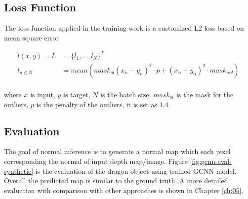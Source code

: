 \subsection{Loss Function}
The loss function applied in the training work is a customized L2 loss based on mean square error

\begin{equation}\label{gcnn-loss}
	\begin{array}{ll}
		l(x,y)= L  &= \{l_1, ..., l_N\}^T\\ 
		l_{n\in N} &= mean(mask_{ol}(x_n - y_n)^2\cdot p + (x_n - y_n)^2\cdot mask_{nol})\\
	\end{array}
\end{equation}

where $ x $ is input, $ y $ is target, $ N $ is the batch size. $ mask_{ol} $ is the mask for the outliers, $ p $ is the penalty of the outliers, it is set as 1.4.

\subsection{Evaluation}
The goal of normal inference is to generate a normal map which each pixel corresponding the normal of input depth map/image. Figure \ref{fig:gcnn-eval-synthetic} is the evaluation of the dragon object using trained GCNN model. Overall the predicted map is similar to the ground truth. A more detailed evaluation with comparison with other approaches is shown in Chapter \ref{ch:05}.


